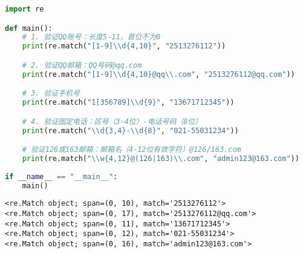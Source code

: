 \vspace{0.5cm}


\begin{lstlisting}[language=Python]
import re

def main():
    # 1. 验证QQ账号：长度5-11，首位不为0
    print(re.match("[1-9]\\d{4,10}", "2513276112"))

    # 2. 验证QQ邮箱：QQ号码@qq.com
    print(re.match("[1-9]\\d{4,10}@qq\\.com", "2513276112@qq.com"))

    # 3. 验证手机号
    print(re.match("1[356789]\\d{9}", "13671712345"))

    # 4. 验证固定电话：区号（3-4位）-电话号码（8位）
    print(re.match("\\d{3,4}-\\d{8}", "021-55031234"))

    # 验证126或163邮箱：邮箱名（4-12位有效字符）@126/163.com
    print(re.match("\\w{4,12}@(126|163)\\.com", "admin123@163.com"))
    
if __name__ == "__main__":
    main()
\end{lstlisting}

\begin{tcolorbox}
	\begin{verbatim}
<re.Match object; span=(0, 10), match='2513276112'>
<re.Match object; span=(0, 17), match='2513276112@qq.com'>
<re.Match object; span=(0, 11), match='13671712345'>
<re.Match object; span=(0, 12), match='021-55031234'>
<re.Match object; span=(0, 16), match='admin123@163.com'>
\end{verbatim}
\end{tcolorbox}

\newpage